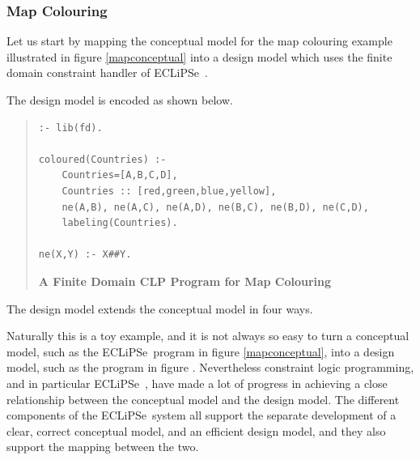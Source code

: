 \documentclass[a4wide]{article}
\newcommand{\ECL}{\mbox{ECLiPSe\ }{\hspace{1mm}}}
\begin{document}
\subsubsection{Map Colouring}
\label{mapcolour}
Let us start by mapping the conceptual model for the map colouring
example illustrated in figure
\ref{mapconceptual} into a design model which uses the finite domain
constraint handler of \ECL.

The design model is encoded as shown below.

\begin{quote}
\begin{verbatim}
:- lib(fd).

coloured(Countries) :-
    Countries=[A,B,C,D],
    Countries :: [red,green,blue,yellow],
    ne(A,B), ne(A,C), ne(A,D), ne(B,C), ne(B,D), ne(C,D),
    labeling(Countries).

ne(X,Y) :- X##Y.

\end{verbatim}
{\bf A Finite Domain CLP Program for Map Colouring}
\label{mapdesign}
\end{quote}

The design model extends the conceptual model in four ways.

Naturally this is a toy example, and it is not always so easy to turn
a conceptual model, such as the \ECL program in figure
\ref{mapconceptual}, into a design 
model, such as the program in figure \pageref{mapdesign}.
Nevertheless constraint logic programming, and in particular \ECL,
have made a lot of progress in achieving a close relationship between
the conceptual model and the design model.
The different components of the \ECL system all support the
separate development of a clear, correct conceptual model, and an
efficient design model, and they also support the mapping between the two.
\end{document}
